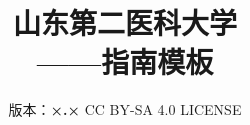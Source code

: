 

\title{%
    \vspace{100pt}
    {\Huge\textbf{山东第二医科大学\\[5pt]——指南模板}}
}
\author{%
    版本：\textbf{×.×} \qquad%
    CC BY-SA 4.0 LICENSE \qquad%
    }
\date{\CurrentCustomTime}
\maketitle

\renewcommand{\thefootnote}{\arabic{footnote}}
